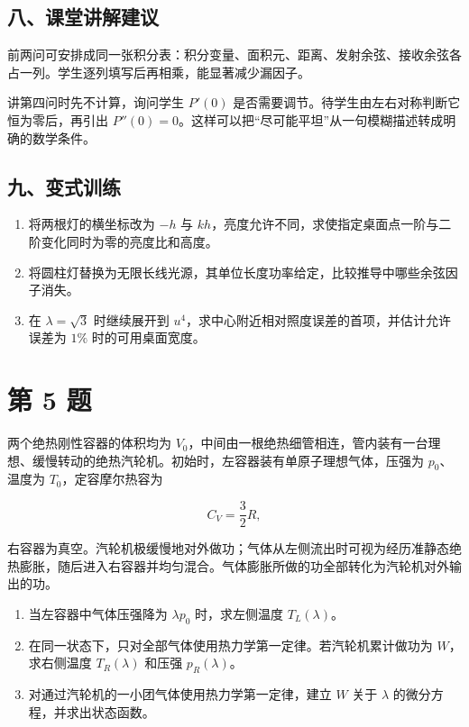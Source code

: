 \documentclass[12pt,a4paper,UTF8]{ctexart}
\newcommand{\tightlist}{\setlength{\itemsep}{0pt}\setlength{\parskip}{0pt}}
\begin{document}
\subsection{八、课堂讲解建议}\label{ux516bux8bfeux5802ux8bb2ux89e3ux5efaux8bae-3}

前两问可安排成同一张积分表：积分变量、面积元、距离、发射余弦、接收余弦各占一列。学生逐列填写后再相乘，能显著减少漏因子。

讲第四问时先不计算，询问学生 \(P'(0)\)
是否需要调节。待学生由左右对称判断它恒为零后，再引出
\(P''(0)=0\)。这样可以把``尽可能平坦''从一句模糊描述转成明确的数学条件。

\subsection{九、变式训练}\label{ux4e5dux53d8ux5f0fux8badux7ec3-3}

\begin{enumerate}
\def\labelenumi{\arabic{enumi}.}
\tightlist
\item
  将两根灯的横坐标改为 \(-h\) 与
  \(kh\)，亮度允许不同，求使指定桌面点一阶与二阶变化同时为零的亮度比和高度。
\item
  将圆柱灯替换为无限长线光源，其单位长度功率给定，比较推导中哪些余弦因子消失。
\item
  在 \(\lambda=\sqrt3\) 时继续展开到
  \(u^4\)，求中心附近相对照度误差的首项，并估计允许误差为 \(1\%\)
  时的可用桌面宽度。
\end{enumerate}

\newpage

\section{第 5 题}\label{ux7b2c-5-ux9898}

两个绝热刚性容器的体积均为
\(V_0\)，中间由一根绝热细管相连，管内装有一台理想、缓慢转动的绝热汽轮机。初始时，左容器装有单原子理想气体，压强为
\(p_0\)、温度为 \(T_0\)，定容摩尔热容为

\[C_V=\frac32R,\]

右容器为真空。汽轮机极缓慢地对外做功；气体从左侧流出时可视为经历准静态绝热膨胀，随后进入右容器并均匀混合。气体膨胀所做的功全部转化为汽轮机对外输出的功。

\begin{enumerate}
\def\labelenumi{\arabic{enumi}.}
\tightlist
\item
  当左容器中气体压强降为 \(\lambda p_0\) 时，求左侧温度
  \(T_L(\lambda)\)。
\item
  在同一状态下，只对全部气体使用热力学第一定律。若汽轮机累计做功为
  \(W\)，求右侧温度 \(T_R(\lambda)\) 和压强 \(p_R(\lambda)\)。
\item
  对通过汽轮机的一小团气体使用热力学第一定律，建立 \(W\) 关于
  \(\lambda\) 的微分方程，并求出状态函数。
\end{enumerate}
\end{document}
